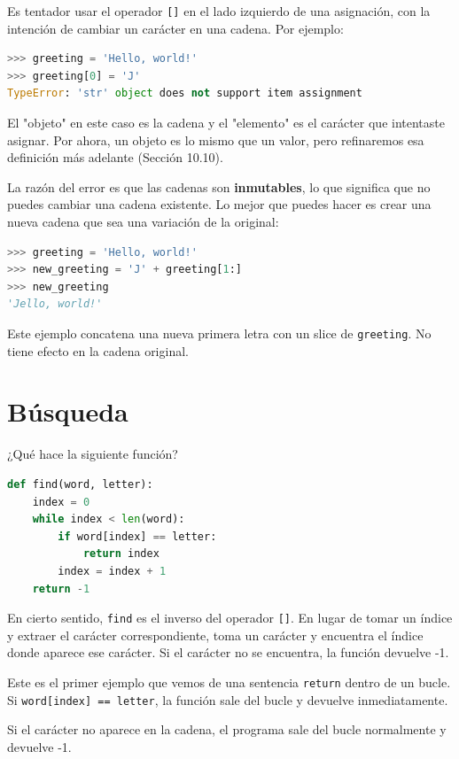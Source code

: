 Es tentador usar el operador \texttt{[]} en el lado izquierdo de una asignación, con la intención de cambiar un carácter en una cadena. Por ejemplo:

\begin{lstlisting}[language=Python]
>>> greeting = 'Hello, world!'
>>> greeting[0] = 'J'
TypeError: 'str' object does not support item assignment
\end{lstlisting}

El "objeto" en este caso es la cadena y el "elemento" es el carácter que intentaste asignar. Por ahora, un objeto es lo mismo que un valor, pero refinaremos esa definición más adelante (Sección 10.10).

La razón del error es que las cadenas son \textbf{inmutables}, lo que significa que no puedes cambiar una cadena existente. Lo mejor que puedes hacer es crear una nueva cadena que sea una variación de la original:

\begin{lstlisting}[language=Python]
>>> greeting = 'Hello, world!'
>>> new_greeting = 'J' + greeting[1:]
>>> new_greeting
'Jello, world!'
\end{lstlisting}

Este ejemplo concatena una nueva primera letra con un slice de \texttt{greeting}. No tiene efecto en la cadena original.

\section{Búsqueda}

¿Qué hace la siguiente función?

\begin{lstlisting}[language=Python]
def find(word, letter):
    index = 0
    while index < len(word):
        if word[index] == letter:
            return index
        index = index + 1
    return -1
\end{lstlisting}

En cierto sentido, \texttt{find} es el inverso del operador \texttt{[]}. En lugar de tomar un índice y extraer el carácter correspondiente, toma un carácter y encuentra el índice donde aparece ese carácter. Si el carácter no se encuentra, la función devuelve -1.

Este es el primer ejemplo que vemos de una sentencia \texttt{return} dentro de un bucle. Si \texttt{word[index] == letter}, la función sale del bucle y devuelve inmediatamente.

Si el carácter no aparece en la cadena, el programa sale del bucle normalmente y devuelve -1.

